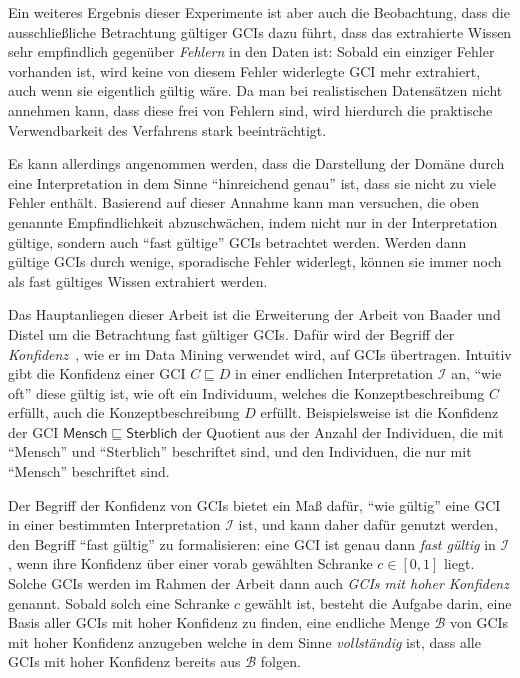 \documentclass[ngerman,fleqn,DIV=12]{scrartcl}
\begin{document}
Ein weiteres Ergebnis dieser Experimente ist aber auch die Beobachtung, dass die
ausschließliche Betrachtung gültiger GCIs dazu führt, dass das extrahierte Wissen sehr
empfindlich gegenüber \emph{Fehlern} in den Daten ist: Sobald ein einziger Fehler
vorhanden ist, wird keine von diesem Fehler widerlegte GCI mehr extrahiert, auch wenn sie
eigentlich gültig wäre.  Da man bei realistischen Datensätzen nicht annehmen kann, dass
diese frei von Fehlern sind, wird hierdurch die praktische Verwendbarkeit des Verfahrens
stark beeinträchtigt.

Es kann allerdings angenommen werden, dass die Darstellung der Domäne durch eine
Interpretation in dem Sinne \enquote{hinreichend genau} ist, dass sie nicht zu viele
Fehler enthält.  Basierend auf dieser Annahme kann man versuchen, die oben genannte
Empfindlichkeit abzuschwächen, indem nicht nur in der Interpretation gültige, sondern auch
\enquote{fast gültige} GCIs betrachtet werden.  Werden dann gültige GCIs durch wenige,
sporadische Fehler widerlegt, können sie immer noch als fast gültiges Wissen extrahiert
werden.

Das Hauptanliegen dieser Arbeit ist die Erweiterung der Arbeit von Baader und Distel um
die Betrachtung fast gültiger GCIs.  Dafür wird der Begriff der
\emph{Konfidenz}~\cite{arules:agrawal:association-rules}, wie er im Data Mining verwendet
wird, auf GCIs übertragen.  Intuitiv gibt die Konfidenz einer GCI $C \sqsubseteq D$ in
einer endlichen Interpretation $\mathcal{I}$ an, \enquote{wie oft} diese gültig ist, \dh
wie oft ein Individuum, welches die Konzeptbeschreibung $C$ erfüllt, auch die
Konzeptbeschreibung $D$ erfüllt.  Beispielsweise ist die Konfidenz der GCI
$\mathsf{Mensch} \sqsubseteq \mathsf{Sterblich}$ der Quotient aus der Anzahl der
Individuen, die mit \enquote{\textsf{Mensch}} und \enquote{\textsf{Sterblich}} beschriftet
sind, und den Individuen, die nur mit \enquote{\textsf{Mensch}} beschriftet sind.

Der Begriff der Konfidenz von GCIs bietet ein Maß dafür, \enquote{wie gültig} eine GCI in
einer bestimmten Interpretation $\mathcal{I}$ ist, und kann daher dafür genutzt werden,
den Begriff \enquote{fast gültig} zu formalisieren: eine GCI ist genau dann \emph{fast
  gültig} in $\mathcal{I}$, wenn ihre Konfidenz über einer vorab gewählten Schranke $c \in
[0,1]$ liegt.  Solche GCIs werden im Rahmen der Arbeit dann auch \emph{GCIs mit hoher
  Konfidenz} genannt.  Sobald solch eine Schranke $c$ gewählt ist, besteht die Aufgabe
darin, eine Basis aller GCIs mit hoher Konfidenz zu finden, \dh eine endliche Menge
$\mathcal{B}$ von GCIs mit hoher Konfidenz anzugeben welche in dem Sinne
\emph{vollständig} ist, dass alle GCIs mit hoher Konfidenz bereits aus $\mathcal{B}$
folgen.
\end{document}
